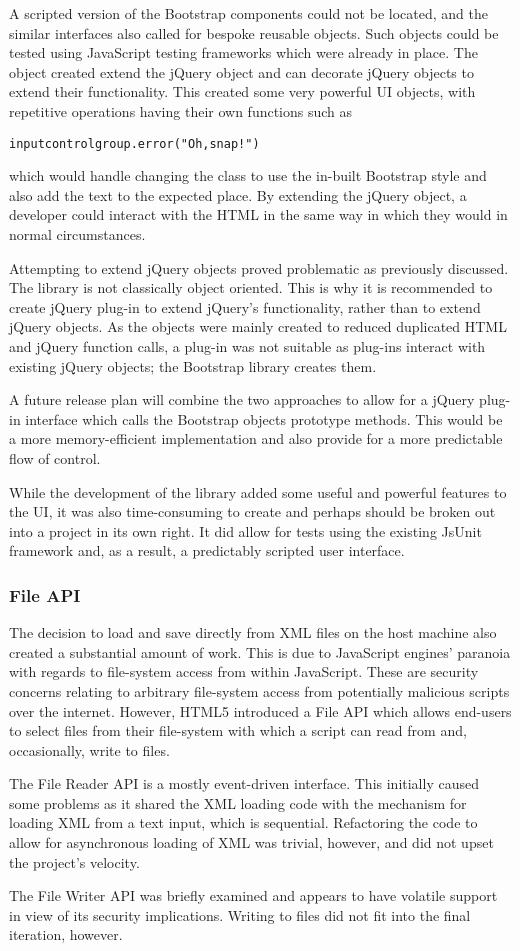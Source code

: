 A scripted version of the Bootstrap components could not be located, and the similar interfaces also called for bespoke reusable objects. Such objects could be tested using Java\-Script testing frameworks which were already in place. The object created extend the jQuery object and can decorate jQuery objects to extend their functionality. This created some very powerful UI objects, with repetitive operations having their own functions such as
\begin{alltt}inputcontrolgroup.error("Oh, snap!")\end{alltt}
which would handle changing the class to use the in-built Bootstrap style and also add the text to the expected place. By extending the jQuery object, a developer could interact with the HTML in the same way in which they would in normal circumstances.

Attempting to extend jQuery objects proved problematic as previously discussed. The library is not classically object oriented. This is why it is recommended to create jQuery plug-in to extend jQuery's functionality, rather than to extend jQuery objects. As the objects were mainly created to reduced duplicated HTML and jQuery function calls, a plug-in was not suitable as plug-ins interact with existing jQuery objects; the Bootstrap library creates them.

A future release plan will combine the two approaches to allow for a jQuery plug-in interface which calls the Bootstrap objects prototype methods. This would be a more memory-efficient implementation and also provide for a more predictable flow of control.

While the development of the library added some useful and powerful features to the UI, it was also time-consuming to create and perhaps should be broken out into a project in its own right. It did allow for tests using the existing JsUnit framework and, as a result, a predictably scripted user interface.

\subsubsection{File API}
The decision to load and save directly from XML files on the host machine also created a substantial amount of work. This is due to Java\-Script engines' paranoia with regards to file-system access from within Java\-Script. These are security concerns relating to arbitrary file-system access from potentially malicious scripts over the internet. However, HTML5 introduced a File API which allows end-users to select files from their file-system with which a script can read from and, occasionally, write to files.

The File Reader API is a mostly event-driven interface. This initially caused some problems as it shared the XML loading code with the mechanism for loading XML from a text input, which is sequential. Refactoring the code to allow for asynchronous loading of XML was trivial, however, and did not upset the project's velocity.

The File Writer API was briefly examined and appears to have volatile support in view of its security implications. Writing to files did not fit into the final iteration, however.
